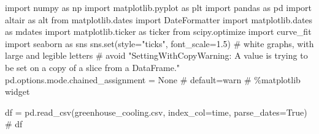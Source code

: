 \documentclass[
  letterpaper,
  DIV=11,
  numbers=noendperiod,
  oneside]{scrreprt}
\newenvironment{Shaded}{\begin{snugshade}}{\end{snugshade}}
\newcommand{\BuiltInTok}[1]{\textcolor[rgb]{0.00,0.23,0.31}{#1}}
\newcommand{\CommentTok}[1]{\textcolor[rgb]{0.37,0.37,0.37}{#1}}
\newcommand{\FloatTok}[1]{\textcolor[rgb]{0.68,0.00,0.00}{#1}}
\newcommand{\ImportTok}[1]{\textcolor[rgb]{0.00,0.46,0.62}{#1}}
\newcommand{\NormalTok}[1]{\textcolor[rgb]{0.00,0.23,0.31}{#1}}
\newcommand{\OperatorTok}[1]{\textcolor[rgb]{0.37,0.37,0.37}{#1}}
\newcommand{\StringTok}[1]{\textcolor[rgb]{0.13,0.47,0.30}{#1}}
\newcommand{\VariableTok}[1]{\textcolor[rgb]{0.07,0.07,0.07}{#1}}
\begin{document}
\begin{Shaded}
\begin{Highlighting}[]
\ImportTok{import}\NormalTok{ numpy }\ImportTok{as}\NormalTok{ np}
\ImportTok{import}\NormalTok{ matplotlib.pyplot }\ImportTok{as}\NormalTok{ plt}
\ImportTok{import}\NormalTok{ pandas }\ImportTok{as}\NormalTok{ pd}
\ImportTok{import}\NormalTok{ altair }\ImportTok{as}\NormalTok{ alt}
\ImportTok{from}\NormalTok{ matplotlib.dates }\ImportTok{import}\NormalTok{ DateFormatter}
\ImportTok{import}\NormalTok{ matplotlib.dates }\ImportTok{as}\NormalTok{ mdates}
\ImportTok{import}\NormalTok{ matplotlib.ticker }\ImportTok{as}\NormalTok{ ticker}
\ImportTok{from}\NormalTok{ scipy.optimize }\ImportTok{import}\NormalTok{ curve\_fit}
\ImportTok{import}\NormalTok{ seaborn }\ImportTok{as}\NormalTok{ sns}
\NormalTok{sns.}\BuiltInTok{set}\NormalTok{(style}\OperatorTok{=}\StringTok{"ticks"}\NormalTok{, font\_scale}\OperatorTok{=}\FloatTok{1.5}\NormalTok{)  }\CommentTok{\# white graphs, with large and legible letters}
\CommentTok{\# avoid "SettingWithCopyWarning: A value is trying to be set on a copy of a slice from a DataFrame."}
\NormalTok{pd.options.mode.chained\_assignment }\OperatorTok{=} \VariableTok{None}  \CommentTok{\# default=\textquotesingle{}warn\textquotesingle{}}
\CommentTok{\# \%matplotlib widget}
\end{Highlighting}
\end{Shaded}

\begin{Shaded}
\begin{Highlighting}[]
\NormalTok{df }\OperatorTok{=}\NormalTok{ pd.read\_csv(}\StringTok{\textquotesingle{}greenhouse\_cooling.csv\textquotesingle{}}\NormalTok{, index\_col}\OperatorTok{=}\StringTok{\textquotesingle{}time\textquotesingle{}}\NormalTok{, parse\_dates}\OperatorTok{=}\VariableTok{True}\NormalTok{)}
\CommentTok{\# df}
\end{Highlighting}
\end{Shaded}
\end{document}
